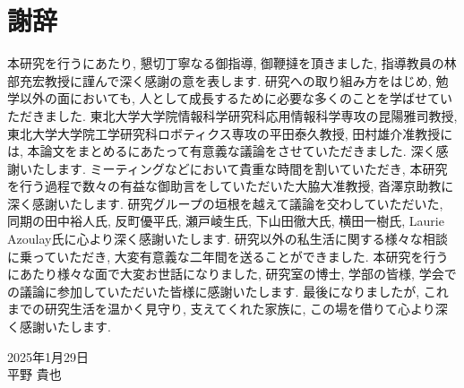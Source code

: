 \cleardoublepage %
\chapter*{謝辞}
本研究を行うにあたり, 懇切丁寧なる御指導, 御鞭撻を頂きました, 指導教員の林部充宏教授に謹んで深く感謝の意を表します.
研究への取り組み方をはじめ, 勉学以外の面においても, 人として成長するために必要な多くのことを学ばせていただきました.
東北大学大学院情報科学研究科応用情報科学専攻の昆陽雅司教授, 東北大学大学院工学研究科ロボティクス専攻の平田泰久教授, 田村雄介准教授には, 本論文をまとめるにあたって有意義な議論をさせていただきました.
深く感謝いたします.
ミーティングなどにおいて貴重な時間を割いていただき, 本研究を行う過程で数々の有益な御助言をしていただいた大脇大准教授, 沓澤京助教に深く感謝いたします.
研究グループの垣根を越えて議論を交わしていただいた, 同期の田中裕人氏, 反町優平氏, 瀬戸崚生氏, 下山田徹大氏, 横田一樹氏, Laurie Azoulay氏に心より深く感謝いたします.
研究以外の私生活に関する様々な相談に乗っていただき, 大変有意義な二年間を送ることができました.
本研究を行うにあたり様々な面で大変お世話になりました, 研究室の博士, 学部の皆様, 学会での議論に参加していただいた皆様に感謝いたします.
最後になりましたが, これまでの研究生活を温かく見守り, 支えてくれた家族に, この場を借りて心より深く感謝いたします.

\begin{flushright}
2025年1月29日\\
平野 貴也
\end{flushright}
